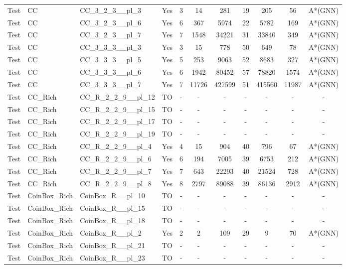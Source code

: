 \documentclass{article}
\begin{document}
\begin{tabular}{lllcccccccc}
Test & CC & CC\_3\_2\_3\_\_pl\_3 & Yes & 3 & 14 & 281 & 19 & 205 & 56 & A*(GNN) \\
Test & CC & CC\_3\_2\_3\_\_pl\_6 & Yes & 6 & 367 & 5974 & 22 & 5782 & 169 & A*(GNN) \\
Test & CC & CC\_3\_2\_3\_\_pl\_7 & Yes & 7 & 1548 & 34221 & 31 & 33840 & 349 & A*(GNN) \\
Test & CC & CC\_3\_3\_3\_\_pl\_3 & Yes & 3 & 15 & 778 & 50 & 649 & 78 & A*(GNN) \\
Test & CC & CC\_3\_3\_3\_\_pl\_5 & Yes & 5 & 253 & 9063 & 52 & 8683 & 327 & A*(GNN) \\
Test & CC & CC\_3\_3\_3\_\_pl\_6 & Yes & 6 & 1942 & 80452 & 57 & 78820 & 1574 & A*(GNN) \\
Test & CC & CC\_3\_3\_3\_\_pl\_7 & Yes & 7 & 11726 & 427599 & 51 & 415560 & 11987 & A*(GNN) \\
Test & CC\_Rich & CC\_R\_2\_2\_9\_\_pl\_12 & TO & - & - & - & - & - & - & - \\
Test & CC\_Rich & CC\_R\_2\_2\_9\_\_pl\_15 & TO & - & - & - & - & - & - & - \\
Test & CC\_Rich & CC\_R\_2\_2\_9\_\_pl\_17 & TO & - & - & - & - & - & - & - \\
Test & CC\_Rich & CC\_R\_2\_2\_9\_\_pl\_19 & TO & - & - & - & - & - & - & - \\
Test & CC\_Rich & CC\_R\_2\_2\_9\_\_pl\_4 & Yes & 4 & 15 & 904 & 40 & 796 & 67 & A*(GNN) \\
Test & CC\_Rich & CC\_R\_2\_2\_9\_\_pl\_6 & Yes & 6 & 194 & 7005 & 39 & 6753 & 212 & A*(GNN) \\
Test & CC\_Rich & CC\_R\_2\_2\_9\_\_pl\_7 & Yes & 7 & 643 & 22293 & 40 & 21524 & 728 & A*(GNN) \\
Test & CC\_Rich & CC\_R\_2\_2\_9\_\_pl\_8 & Yes & 8 & 2797 & 89088 & 39 & 86136 & 2912 & A*(GNN) \\
Test & CoinBox\_Rich & CoinBox\_R\_\_pl\_10 & TO & - & - & - & - & - & - & - \\
Test & CoinBox\_Rich & CoinBox\_R\_\_pl\_15 & TO & - & - & - & - & - & - & - \\
Test & CoinBox\_Rich & CoinBox\_R\_\_pl\_18 & TO & - & - & - & - & - & - & - \\
Test & CoinBox\_Rich & CoinBox\_R\_\_pl\_2 & Yes & 2 & 2 & 109 & 29 & 9 & 70 & A*(GNN) \\
Test & CoinBox\_Rich & CoinBox\_R\_\_pl\_21 & TO & - & - & - & - & - & - & - \\
Test & CoinBox\_Rich & CoinBox\_R\_\_pl\_23 & TO & - & - & - & - & - & - & - \\

\end{tabular}
\end{document}
